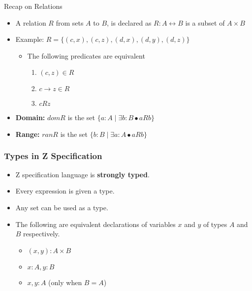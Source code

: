 \documentclass[aspectratio=169]{beamer}
\begin{document}
\begin{frame}{Recap on Relations}
    \begin{itemize}
        \item A relation $R$ from sets $A$ to $B$, is declared as $R : A \leftrightarrow B$ is a subset of $A \times B$
        \item Example: $R = \{(c, x), (c, z), (d, x), (d, y), (d, z)\}$
        \begin{itemize}
            \item The following predicates are equivalent
            \begin{enumerate}
                \item $(c, z) \in R$
                \item $c \rightarrow z \in R$
                \item $cRz$
            \end{enumerate}
        \end{itemize}
        \item \textbf{Domain:} $dom R$ is the set $\{a : A \mid \exists b : B \bullet a R b\}$
        \item \textbf{Range:} $ran R$ is the set $\{b : B \mid \exists a : A \bullet a R b\}$
    \end{itemize}
\end{frame}


\begin{frame}
    \frametitle{Types in Z Specification}
    \begin{itemize}
        \item Z specification language is \textbf{strongly typed}.
        \item Every expression is given a type.
        \item Any set can be used as a type.
        \item The following are equivalent declarations of variables $x$ and $y$ of types $A$ and $B$ respectively. 
        \begin{itemize}
            \item $(x, y) : A \times B$
            \item $x: A, y: B$
            \item $x, y : A$ (only when $B = A$)
        \end{itemize}
    \end{itemize}
\end{frame}
\end{document}
